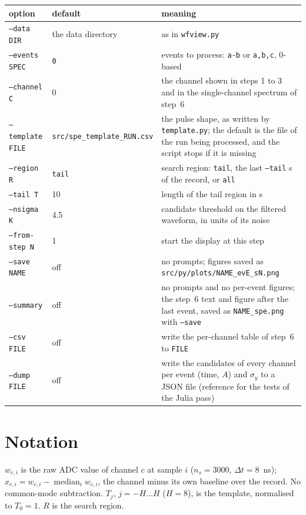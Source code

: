 \documentclass[11pt]{article}
\newcommand{\code}[1]{\texttt{#1}}
\newcommand{\us}{\textmu s}
\begin{document}
\begin{center}
\begin{tabular}{l l p{74mm}}
\toprule
option & default & meaning \\
\midrule
\code{--data DIR} & the data directory & as in \code{wfview.py} \\
\code{--events SPEC} & \code{0} & events to process: \code{a-b} or \code{a,b,c}, 0-based \\
\code{--channel C} & 0 & the channel shown in steps 1 to 3 and in the single-channel spectrum of step~6 \\
\code{--template FILE} & \code{src/spe\_template\_RUN.csv} & the pulse shape, as written by \code{template.py}; the default is the file of the run being processed, and the script stops if it is missing \\
\code{--region R} & \code{tail} & search region: \code{tail}, the last \code{--tail} \us{} of the record, or \code{all} \\
\code{--tail T} & 10 & length of the tail region in \us \\
\code{--nsigma K} & 4.5 & candidate threshold on the filtered waveform, in units of its noise \\
\code{--from-step N} & 1 & start the display at this step \\
\code{--save NAME} & off & no prompts; figures saved as \code{src/py/plots/NAME\_evE\_sN.png} \\
\code{--summary} & off & no prompts and no per-event figures; the step~6 text and figure after the last event, saved as \code{NAME\_spe.png} with \code{--save} \\
\code{--csv FILE} & off & write the per-channel table of step~6 to \code{FILE} \\
\code{--dump FILE} & off & write the candidates of every channel per event (time, $A$) and $\sigma_y$ to a JSON file (reference for the tests of the Julia pass) \\
\bottomrule
\end{tabular}
\end{center}

\section{Notation}

$w_{c,i}$ is the raw ADC value of channel $c$ at sample $i$ ($n_s =
3000$, $\Delta t = 8$~ns); $x_{c,i} = w_{c,i} - \operatorname{median}_i
w_{c,i}$, the channel minus its own baseline over the record. No
common-mode subtraction. $T_j$, $j = -H \dots H$ ($H = 8$), is the
template, normalised to $T_0 = 1$. $R$ is the search region.
\end{document}
